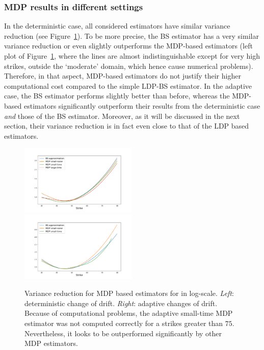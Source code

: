 \subsubsection{MDP results in different settings}

In the deterministic case, all considered estimators have similar variance reduction (see Figure~\ref{fig:MDPvarianceRedu}). 
To be more precise, the BS estimator has a very similar variance reduction or even slightly outperforms the MDP-based estimators (left plot of Figure~\ref{fig:MDPvarianceRedu}, where the lines are almost indistinguishable except for very high strikes, outside the `moderate' domain, which hence cause numerical problems). Therefore, in that aspect, MDP-based estimators do not justify their higher computational cost compared to the simple LDP-BS estimator. In the adaptive case, the BS estimator performs slightly better than before, whereas the MDP-based estimators significantly outperform their results from the deterministic case \textit{and} those of the BS estimator. Moreover, as it will be discussed in the next section, their variance reduction is in fact even close to that of the LDP based estimators.
\begin{figure}[H]
    \centering
    \includegraphics[width=0.495\textwidth, trim={2cm 0.5cm 2cm 1cm }]{content/reschap3/Figures/HESTON/compare-mdp-new.pdf}
    \includegraphics[width=0.495\textwidth, trim={2cm 0.5cm 2cm 1cm }]{content/reschap3/Figures/HESTON/compare-mdpada1-new.pdf}
    \caption{Variance reduction for MDP based estimators for in log-scale. \textit{Left}: deterministic change of drift. \textit{Right}: adaptive changes of drift. Because of computational problems, the adaptive small-time MDP estimator was not computed correctly for a strikes greater than $75$. Nevertheless, it looks to be outperformed significantly by other MDP estimators.}\label{fig:MDPvarianceRedu}
\end{figure}

